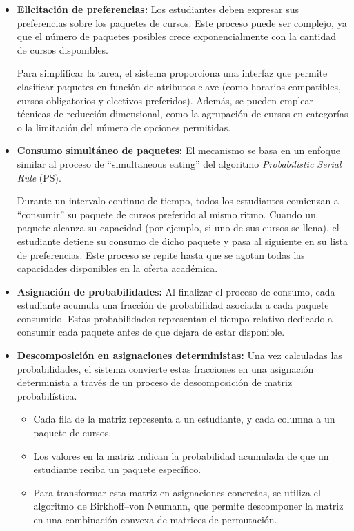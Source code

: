 \documentclass{article}
\begin{document}
\begin{itemize}
    \item \textbf{Elicitación de preferencias:} Los estudiantes deben expresar sus preferencias sobre los paquetes de cursos. Este proceso puede ser complejo, ya que el número de paquetes posibles crece exponencialmente con la cantidad de cursos disponibles.

    Para simplificar la tarea, el sistema proporciona una interfaz que permite clasificar paquetes en función de atributos clave (como horarios compatibles, cursos obligatorios y electivos preferidos). Además, se pueden emplear técnicas de reducción dimensional, como la agrupación de cursos en categorías o la limitación del número de opciones permitidas.

    \item \textbf{Consumo simultáneo de paquetes:} El mecanismo se basa en un enfoque similar al proceso de ``simultaneous eating'' del algoritmo \textit{Probabilistic Serial Rule} (PS).

    Durante un intervalo continuo de tiempo, todos los estudiantes comienzan a ``consumir'' su paquete de cursos preferido al mismo ritmo. Cuando un paquete alcanza su capacidad (por ejemplo, si uno de sus cursos se llena), el estudiante detiene su consumo de dicho paquete y pasa al siguiente en su lista de preferencias. Este proceso se repite hasta que se agotan todas las capacidades disponibles en la oferta académica.

    \item \textbf{Asignación de probabilidades:} Al finalizar el proceso de consumo, cada estudiante acumula una fracción de probabilidad asociada a cada paquete consumido. Estas probabilidades representan el tiempo relativo dedicado a consumir cada paquete antes de que dejara de estar disponible.

    \item \textbf{Descomposición en asignaciones deterministas:} Una vez calculadas las probabilidades, el sistema convierte estas fracciones en una asignación determinista a través de un proceso de descomposición de matriz probabilística.

    \begin{itemize}
        \item Cada fila de la matriz representa a un estudiante, y cada columna a un paquete de cursos.
        \item Los valores en la matriz indican la probabilidad acumulada de que un estudiante reciba un paquete específico.
        \item Para transformar esta matriz en asignaciones concretas, se utiliza el algoritmo de Birkhoff–von Neumann, que permite descomponer la matriz en una combinación convexa de matrices de permutación.
    \end{itemize}


\end{itemize}
\end{document}
